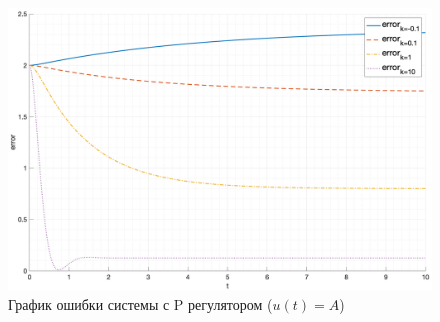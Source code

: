 \begin{figure}
    \centering
    \includegraphics[width=\textwidth]{"media/plots/task3_error1.png"}
    \caption{График ошибки системы с P регулятором ($u(t) = A$)}
    \label{fig:task3_error1}
\end{figure}






